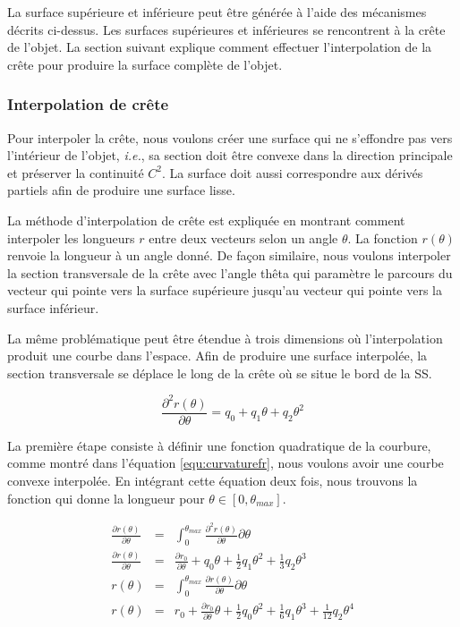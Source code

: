 La surface supérieure et inférieure peut être générée à l'aide des mécanismes décrits ci-dessus.
Les surfaces supérieures et inférieures se rencontrent à la crête de l'objet.
La section suivant explique comment effectuer l'interpolation de la crête pour produire la surface complète de l'objet.

\subsubsection{Interpolation de crête}
\label{sec:crestInterpolationfr}

Pour interpoler la crête, nous voulons créer une surface qui ne s'effondre pas vers l'intérieur de l'objet, \textit{i.e.}, sa section doit être convexe dans la direction principale et préserver la continuité $C^2$. 
La surface doit aussi correspondre aux dérivés partiels afin de produire une surface lisse.

La méthode d'interpolation de crête est expliquée en montrant comment interpoler les longueurs $r$ entre deux vecteurs selon un angle $\theta$.
La fonction $r(\theta)$ renvoie la longueur à un angle donné.
De façon similaire, nous voulons interpoler la section transversale de la crête
avec l'angle thêta qui paramètre le parcours du vecteur qui pointe vers la surface supérieure 
jusqu'au vecteur qui pointe vers la surface inférieur.

La même problématique peut être étendue à trois dimensions où l'interpolation produit une courbe dans l'espace.
Afin de produire une surface interpolée, la section transversale se déplace le long de la crête où se situe le bord de la SS.

\begin{equation} 
 \frac{\partial^2 r(\theta)}{\partial \theta} = q_0  +  q_1  \theta + q_2  \theta^2   
 \label{equ:curvaturefr}
\end{equation}

La première étape consiste à définir une fonction quadratique de la courbure, comme montré dans l'équation \ref{equ:curvaturefr}, nous voulons avoir une courbe convexe interpolée.
En intégrant cette équation deux fois, nous trouvons la fonction qui donne la longueur pour $\theta \in [0, \theta_{max}]$.

\begin{eqnarray} 
  \frac{\partial r(\theta)}{\partial \theta} &=& \int_0^{\theta_{max}} \frac{\partial^2 r(\theta)}{\partial \theta} \partial \theta \\
  \frac{\partial r(\theta)}{\partial \theta} &=& \frac{\partial r_0}{\partial \theta} + q_0  \theta + \frac{1}{2}  q_1  \theta^2 + \frac{1}{3}  q_2  \theta^3  \\
  r(\theta) &=& \int_0^{\theta_{max}} \frac{\partial r(\theta)}{\partial \theta} \partial \theta \\
  r(\theta) &=& r_0 + \frac{\partial r_0}{\partial \theta}  \theta + \frac{1}{2}  q_0  \theta^2 + \frac{1}{6}  q_1  \theta^3 + \frac{1}{12}  q_2  \theta^4  
\end{eqnarray}

